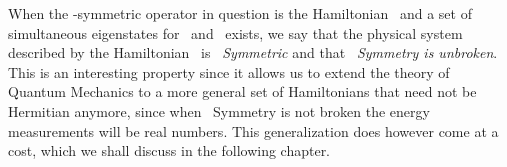         When the \PT-symmetric operator in question is the Hamiltonian \hH\ and a set of simultaneous eigenstates for \hH\ and \hPT\ exists, we say that the physical system described by the Hamiltonian \hH\ is \emph{\PT\ Symmetric} and that \emph{\PT\ Symmetry is unbroken}. This is an interesting property since it allows us to extend the theory of Quantum Mechanics to a more general set of Hamiltonians that need not be Hermitian anymore, since when \PT\ Symmetry is not broken the energy measurements will be real numbers. This generalization does however come at a cost, which we shall discuss in the following chapter.